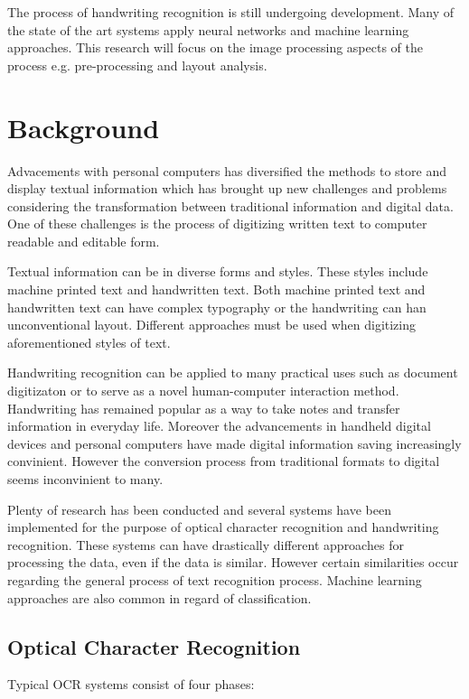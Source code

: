 \documentclass{article}
\begin{document}
    The process of handwriting recognition is still undergoing development. Many of the state of the art systems apply neural networks and machine learning approaches. This research will focus on the image processing aspects of the process e.g. pre-processing and layout analysis.

  \newpage
  \section{Background}
    Advacements with personal computers has diversified the methods to store and display textual information which has brought up new challenges and problems considering the transformation between traditional information and digital data. One of these challenges is the process of digitizing written text to computer readable and editable form.

    Textual information can be in diverse forms and styles. These styles include machine printed text and handwritten text. Both machine printed text and handwritten text can have complex typography or the handwriting can han unconventional layout. Different approaches must be used when digitizing aforementioned styles of text.

    Handwriting recognition can be applied to many practical uses such as document digitizaton or to serve as a novel human-computer interaction method. Handwriting has remained popular as a way to take notes and transfer information in everyday life. Moreover the advancements in handheld digital devices and personal computers have made digital information saving increasingly convinient. However the conversion process from traditional formats to digital seems inconvinient to many.

    Plenty of research has been conducted and several systems have been implemented for the purpose of optical character recognition and handwriting recognition. These systems can have drastically different approaches for processing the data, even if the data is similar. However certain similarities occur regarding the general process of text recognition process. Machine learning approaches are also common in regard of classification.



  \subsection{Optical Character Recognition}

    Typical OCR systems consist of four phases:
\end{document}
